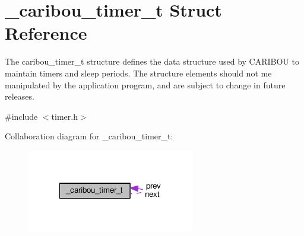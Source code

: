 \hypertarget{struct__caribou__timer__t}{\section{\-\_\-caribou\-\_\-timer\-\_\-t Struct Reference}
\label{struct__caribou__timer__t}
}


The caribou\-\_\-timer\-\_\-t structure defines the data structure used by C\-A\-R\-I\-B\-O\-U to maintain timers and sleep periods. The structure elements should not me manipulated by the application program, and are subject to change in future releases.  




{\ttfamily \#include $<$timer.\-h$>$}



Collaboration diagram for \-\_\-caribou\-\_\-timer\-\_\-t\-:
\nopagebreak
\begin{figure}[H]
\begin{center}
\leavevmode
\includegraphics[width=208pt]{struct__caribou__timer__t__coll__graph}
\end{center}
\end{figure}
